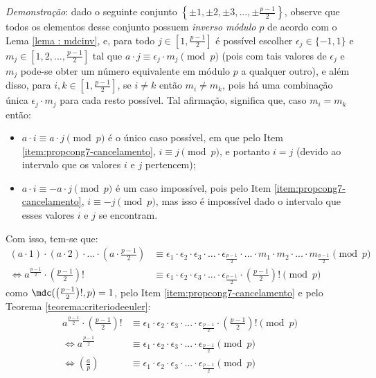 \noindent
\textit{Demonstração}: dado o seguinte conjunto $\left\{\pm 1, \pm 2, \pm 3, ..., \pm \frac{p-1}{2} \right\}$, observe que todos os elementos desse conjunto possuem \textit{inverso módulo $p$} de acordo com o Lema \ref{lema : mdcinv}, e, para todo $j \in \left[1, \frac{p-1}{2}\right]$ é possível escolher $\epsilon_j \in \{-1, 1\}$ e $m_j \in \left[1,2, ..., \frac{p-1}{2}\right]$ tal que $a \cdot j \equiv \epsilon_j \cdot m_j \pmod{p}$ (pois com tais valores de $\epsilon_j$ e $m_j$ pode-se obter um número equivalente em módulo $p$ a qualquer outro), e além disso, para $i, k \in \left[1, \frac{p-1}{2}\right]$, se $i \neq k$ então $m_i \neq m_k$, pois há uma combinação única $\epsilon_j \cdot m_j$ para cada resto possível. Tal afirmação, significa que, caso $m_i = m_k$ então:

    \begin{itemize}
        \item $a \cdot i \equiv a \cdot j \pmod{p}$ é o único caso possível, em que pelo Item \ref{item:propcong7-cancelamento}, $i \equiv j \pmod{p}$, e portanto $i = j$ (devido ao intervalo que os valores $i$ e $j$ pertencem);

        \item $a \cdot i \equiv -a \cdot j \pmod{p}$ é um caso impossível, pois pelo Item \ref{item:propcong7-cancelamento}, $i \equiv -j \pmod{p}$, mas isso é impossível dado o intervalo que esses valores $i$ e $j$ se encontram.
    \end{itemize}
\noindent
Com isso, tem-se que:
\begin{align*}
    (a \cdot 1) \cdot (a \cdot 2) \cdot ...  \cdot (a \cdot \frac{p-1}{2}) & \equiv \epsilon_1 \cdot \epsilon_2 \cdot \epsilon_3 \cdot ... \cdot \epsilon_{\frac{p-1}{2}} \cdot ... \cdot m_1 \cdot m_2 \cdot ... \cdot m_{\frac{p-1}{2}} \pmod{p}
    \\
    \Longleftrightarrow 
    a^{\frac{p-1}{2}} \cdot \left(\frac{p-1}{2} \right)! & \equiv \epsilon_1 \cdot \epsilon_2 \cdot \epsilon_3 \cdot ... \cdot \epsilon_{\frac{p-1}{2}} \cdot \left(\frac{p-1}{2} \right)! \pmod{p}
\end{align*}
como $\mdc(\left(\frac{p-1}{2} \right)!, p) = 1$, pelo Item \ref{item:propcong7-cancelamento} e pelo Teorema \ref{teorema:criteriodeeuler}:
\begin{align*}
    a^{\frac{p-1}{2}} \cdot \left(\frac{p-1}{2} \right)! & \equiv \epsilon_1 \cdot \epsilon_2 \cdot \epsilon_3 \cdot ... \cdot \epsilon_{\frac{p-1}{2}} \cdot \left(\frac{p-1}{2} \right)! \pmod{p}
    \\
    \Longleftrightarrow a^{\frac{p-1}{2}} & \equiv  \epsilon_1 \cdot \epsilon_2 \cdot \epsilon_3 \cdot ... \cdot \epsilon_{\frac{p-1}{2}} \pmod{p}
    \\
    \Longleftrightarrow \left(\frac{a}{p}\right) & \equiv  \epsilon_1 \cdot \epsilon_2 \cdot \epsilon_3 \cdot ... \cdot \epsilon_{\frac{p-1}{2}} \pmod{p}
\end{align*}
